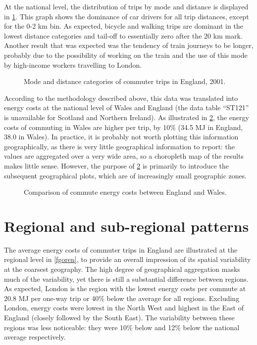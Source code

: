 At the national level, the distribution of trips by mode and distance is
displayed in \cref{fengmodedis}. This graph shows the
dominance of car drivers for all trip distances, except for the 0-2 km bin.
As expected, bicycle and walking trips are dominant in the lowest
distance categories and tail-off to essentially zero after the 20 km mark.
Another result that was expected was the tendency of train journeys to
be longer, probably due to the possibility of working on the train and
the use of this mode by high-income workers travelling to London.

\begin{figure}[htbp]
  \caption[Mode and distance categories of commute in England]
  {Mode and distance categories of commuter trips in England, 2001.}
  \label{fengmodedis}
\end{figure} %

According to the methodology described above,
this data was translated into energy costs at the national level of
Wales and England (the data table ``ST121'' is unavailable for Scotland and
Northern Ireland). As illustrated in \cref{few}, the energy costs of commuting
in Wales are higher per trip, by 10\% (34.5 MJ in England, 38.0 in Wales).
In practice, it is probably not worth plotting this information geographically,
as there is very little geographical information to report:
the values are aggregated over a very wide area, so a choropleth map
of the results makes little sense. However, the purpose of  \cref{few}
is primarily to introduce the subsequent geographical plots, which
are of increasingly small geographic zones.

\begin{figure}
 \centering{
 \texttt{[image: ew]} }
 \caption{Comparison of commute energy costs between England and Wales.}
 \label{few}
\end{figure}



\section{Regional and sub-regional patterns} \label{sregional}
The average energy costs of commuter trips in England
are illustrated at the regional level in \cref{fgoren}, to provide an
overall impression of its spatial variability at the coarsest geography.
The high degree of geographical aggregation masks much of the variability,
yet there is still a substantial difference between regions. As expected,
London is the region with the lowest energy costs per commute at
20.8 MJ per one-way trip or 40\% below the average for all regions.
Excluding London, energy costs were lowest in the North West
and highest in the East of England (closely followed by the South East).
The variability between these regions was less noticeable:
they were 10\% below and 12\% below the national average respectively.


